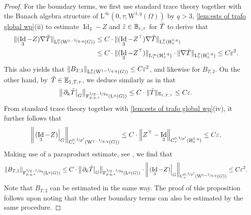 \documentclass[10pt]{amsart}
\theoremstyle{plain}
\theoremstyle{definition}
\theoremstyle{thm}
\numberwithin{equation}{section}
\newcommand{\rL}{\mathrm{L}}
\newcommand{\rH}{\mathrm{H}}
\newcommand{\rW}{\mathrm{W}}
\newcommand{\rC}{\mathrm{C}}
\newcommand{\rF}{\mathrm{F}}
\newcommand{\E}{\mathbb{E}}
\newcommand{\del}{\partial}
\newcommand{\eps}{\varepsilon}
\DeclareMathOperator{\Id}{Id}
\newcommand{\tz}{\Tilde{z}}
\newcommand{\tT}{\Tilde{T}}
\begin{document}
\begin{proof}
For the boundary terms, we first use standard trace theory together with the Banach algebra structure of $\rL^\infty(0,\tau;\rW^{1,q}(\Omega))$ by $q > 3$, \autoref{lem:ests of trafo global wp}(ii) to estimate $\Id_3 - Z$ and $\tz \in \mathbb{B}_{\eps,\tau}$ for $\tT$ to derive that
\begin{equation*}
    \begin{aligned}
        \| (\Id_3 - Z) \nabla \tT \|_{\rL_\tau^p(\rW^{1-\nicefrac{1}{q},q}(G))} 
        &\le C \cdot \| (\Id_3 - Z^\top) \nabla \tT \|_{\rL_\tau^p(\rH_x^{1,q})}\\
        &\le C \cdot \| (\Id_3 - Z^\top) \|_{\rL_\tau^\infty(\rH_x^{1,q})} \cdot \| \nabla \tT \|_{\rL_\tau^p(\rH_x^{1,q})} \le C \eps^2.
    \end{aligned}
\end{equation*}
This also yields that $\| B_{T,1} \|_{\rL_\tau^p(\rW^{1-\nicefrac{1}{q},q}(G))} \le C \eps^2$, and likewise for $B_{T,2}$.
On the other hand, by~$\tT \in \E_{1,T,\tau}$, we deduce similarly as in \cite[Prop.~6.4]{DHP:07} that 
\begin{equation*}
    \left\| \left.\del_{k} \tT \right|_{G} \right\|_{\rF_{p,q,\tau}^{\nicefrac{1}{2}-\nicefrac{1}{2q}}(\rL^q(G))} \le C \cdot \| \tT \|_{\E_{1,T,\tau}} \le C \eps.
\end{equation*}
From standard trace theory together with \autoref{lem:ests of trafo global wp}(iv), it further follows that
\begin{equation*}
    \left\| \left.(\Id_3 - Z) \right|_{G} \right\|_{\rC_\tau^{0,\nicefrac{1}{p'}}(\rW^{1-\nicefrac{1}{q},q}(G))} \le C \cdot \left\| Z^\top - \Id_3 \right\|_{\rC_\tau^{0,\nicefrac{1}{p'}}(\rH_x^{1,q})} \le C \eps.
\end{equation*}
Making use of a paraproduct estimate, see \cite[Thm.~2.8.2(ii)]{Tri:10}, we find that
\begin{equation*}
    \begin{aligned}
        \| B_{T,1} \|_{\rF_{p,q,\tau}^{\nicefrac{1}{2}-\nicefrac{1}{2q}}(\rL^q(G))}
        \le C \cdot \left\| \left.\del_{k} \tT \right|_{G} \right\|_{\rF_{p,q,\tau}^{\nicefrac{1}{2}-\nicefrac{1}{2q}}(\rL^q(G))} \cdot \left\| \left.(\Id_3 - Z) \right|_{G} \right\|_{\rC_\tau^{0,\nicefrac{1}{p'}}(\rW^{1-\nicefrac{1}{q},q}(G))} \le C \eps^2.
    \end{aligned}
\end{equation*}
Note that $B_{T,2}$ can be estimated in the same way.
The proof of this proposition follows upon noting that the other boundary terms can also be estimated by the same procedure.
\end{proof}
\end{document}
